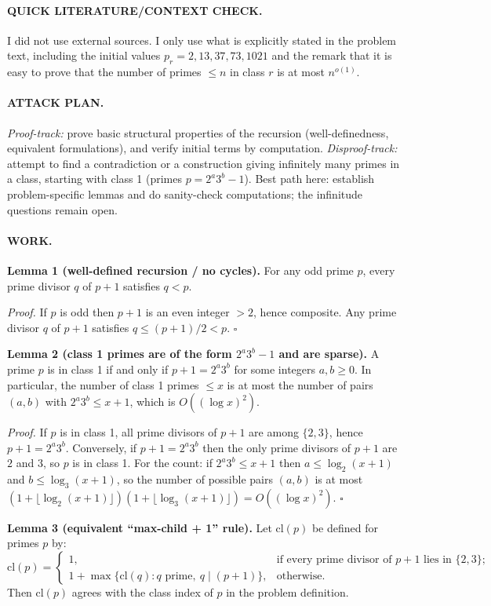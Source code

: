 \paragraph{QUICK LITERATURE/CONTEXT CHECK.}
I did not use external sources. I only use what is explicitly stated in the problem text, including the initial values $p_r=2,13,37,73,1021$ and the remark that it is easy to prove that the number of primes $\le n$ in class $r$ is at most $n^{o(1)}$.

\paragraph{ATTACK PLAN.}
\emph{Proof-track:} prove basic structural properties of the recursion (well-definedness, equivalent formulations), and verify initial terms by computation.
\emph{Disproof-track:} attempt to find a contradiction or a construction giving infinitely many primes in a class, starting with class 1 (primes $p=2^a3^b-1$).
Best path here: establish problem-specific lemmas and do sanity-check computations; the infinitude questions remain open.

\paragraph{WORK.}
\textbf{Lemma 1 (well-defined recursion / no cycles).}
For any odd prime $p$, every prime divisor $q$ of $p+1$ satisfies $q<p$.

\emph{Proof.}
If $p$ is odd then $p+1$ is an even integer $>2$, hence composite.
Any prime divisor $q$ of $p+1$ satisfies $q\le (p+1)/2<p$.
\hfill$\square$

\textbf{Lemma 2 (class 1 primes are of the form $2^a3^b-1$ and are sparse).}
A prime $p$ is in class 1 if and only if $p+1=2^a3^b$ for some integers $a,b\ge 0$.
In particular, the number of class 1 primes $\le x$ is at most the number of pairs $(a,b)$ with $2^a3^b\le x+1$, which is $O((\log x)^2)$.

\emph{Proof.}
If $p$ is in class 1, all prime divisors of $p+1$ are among $\{2,3\}$, hence $p+1=2^a3^b$.
Conversely, if $p+1=2^a3^b$ then the only prime divisors of $p+1$ are $2$ and $3$, so $p$ is in class 1.
For the count: if $2^a3^b\le x+1$ then $a\le \log_2(x+1)$ and $b\le \log_3(x+1)$, so the number of possible pairs $(a,b)$ is at most $(1+\lfloor \log_2(x+1)\rfloor)(1+\lfloor \log_3(x+1)\rfloor)=O((\log x)^2)$.
\hfill$\square$

\textbf{Lemma 3 (equivalent “max-child + 1” rule).}
Let $\mathrm{cl}(p)$ be defined for primes $p$ by:
\[
\mathrm{cl}(p)=
\begin{cases}
1, & \text{if every prime divisor of }p+1\text{ lies in }\{2,3\};\\
1+\max\{\mathrm{cl}(q): q \text{ prime},\ q\mid(p+1)\}, & \text{otherwise}.
\end{cases}
\]
Then $\mathrm{cl}(p)$ agrees with the class index of $p$ in the problem definition.

